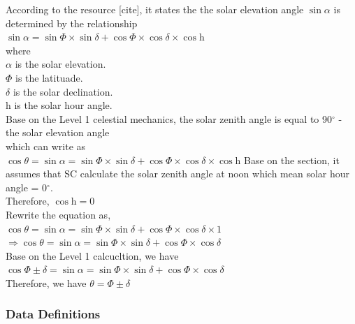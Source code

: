 \documentclass[12pt]{article}
\begin{document}
	According to the resource [cite], it states the the solar elevation angle $\sin{\alpha}$ is
determined by the relationship\\
					$\sin{\alpha} = \sin{\Phi} \times \sin{\delta} + \cos{\Phi} \times \cos{\delta} \times \cos{\text{h}}$\\
		where \\
		  $\alpha$ is the solar elevation.\\
		  $\Phi$ is the latituade.\\
		  $\delta$ is the solar declination.\\
		  $\text{h}$ is the solar hour angle.\\
Base on the Level 1 celestial mechanics, the solar zenith angle 
is equal to 90$^\circ$ - the solar elevation angle\\
			which can write as\\
$\cos{\theta} = \sin{\alpha} = \sin{\Phi} \times \sin{\delta} + \cos{\Phi} \times \cos{\delta} \times \cos{\text{h}}$
			Base on the  section, it assumes that SC calculate the solar zenith 
angle at noon which mean solar hour angle = 0$^\circ$.\\
			Therefore, $\cos{\text{h}} = 0$\\
				Rewrite the equation as,\\
$\cos{\theta} = \sin{\alpha} = \sin{\Phi} \times \sin{\delta} + \cos{\Phi} \times \cos{\delta} \times 1$\\
$\Rightarrow  \cos{\theta} = \sin{\alpha} = \sin{\Phi} \times \sin{\delta} + \cos{\Phi} \times \cos{\delta}$\\
			Base on the Level 1 calcucltion, we have\\
$\cos{\Phi \pm \delta} = \sin{\alpha} = \sin{\Phi} \times \sin{\delta} + \cos{\Phi} \times \cos{\delta}$\\
			Therefore, we have
			$\theta = \Phi \pm \delta$\\

\subsubsection{Data Definitions}\label{sec_datadef}

\iffalse{}
\end{document}
